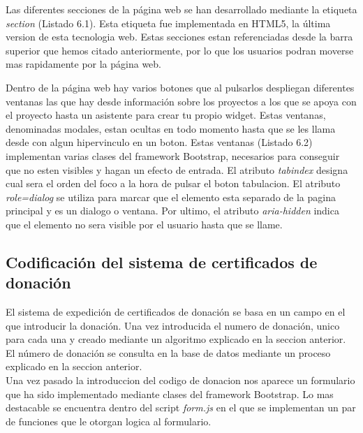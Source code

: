 Las diferentes secciones de la página web se han desarrollado mediante la etiqueta \textit{section} (Listado 6.1). Esta etiqueta fue implementada en HTML5, la última version de esta tecnologia web. Estas secciones estan referenciadas desde la barra superior que hemos citado anteriormente, por lo que los usuarios podran moverse mas rapidamente por la página web.\\



Dentro de la página web hay varios botones que al pulsarlos despliegan diferentes ventanas las que hay desde información sobre los proyectos a los que se apoya con el proyecto hasta un asistente para crear tu propio widget. Estas ventanas, denominadas modales, estan ocultas en todo momento hasta que se les llama desde con algun hipervinculo en un boton. Estas ventanas (Listado 6.2) implementan varias clases del framework Bootstrap, necesarios para conseguir que no esten visibles y hagan un efecto de entrada. El atributo \textit{tabindex} designa cual sera el orden del foco a la hora de pulsar el boton tabulacion. El atributo \textit{role=dialog} se utiliza para marcar que el elemento esta separado de la pagina principal y es un dialogo o ventana. Por ultimo, el atributo \textit{aria-hidden} indica que el elemento no sera visible por el usuario hasta que se llame.\\


\subsection{Codificación del sistema de certificados de donación}
El sistema de expedición de certificados de donación se basa en un campo en el que introducir la donación. Una vez introducida el numero de donación, unico para cada una y creado mediante un algoritmo explicado en la seccion anterior. El número de donación se consulta en la base de datos mediante un proceso explicado en la seccion anterior.\\

Una vez pasado la introduccion del codigo de donacion nos aparece un formulario que ha sido implementado mediante clases del framework Bootstrap. Lo mas destacable se encuentra dentro del script \textit{form.js} en el que se implementan un par de funciones que le otorgan logica al formulario.\\

